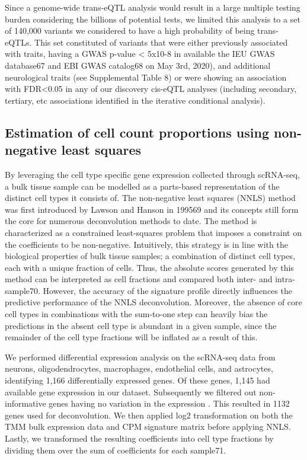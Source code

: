 Since a genome-wide trans-eQTL analysis would result in a large multiple testing burden considering the billions of potential tests, we limited this analysis to a set of 140,000 variants we considered to have a high probability of being trans-eQTLs. This set constituted of variants that were either previously associated with traits, having a GWAS p-value < 5x10-8 in available the IEU GWAS database67 and EBI GWAS catalog68 on May 3rd, 2020), and additional neurological traits (see Supplemental Table 8) or were showing an association with FDR<0.05 in any of our discovery cis-eQTL analyses (including secondary, tertiary, etc associations identified in the iterative conditional analysis). 

\subsection{Estimation of cell count proportions using non-negative least squares}
By leveraging the cell type specific gene expression collected through scRNA-seq, a bulk tissue sample can be modelled as a parts-based representation of the distinct cell types it consists of. The non-negative least squares (NNLS) method was first introduced by Lawson and Hanson in 199569 and its concepts still form the core for numerous deconvolution methods to date. The method is characterized as a constrained least-squares problem that imposes a constraint on the coefficients to be non-negative. Intuitively, this strategy is in line with the biological properties of bulk tissue samples; a combination of distinct cell types, each with a unique fraction of cells. Thus, the absolute scores generated by this method can be interpreted as cell fractions and compared both inter- and intra-sample70. However, the accuracy of the signature profile directly influences the predictive performance of the NNLS deconvolution. Moreover, the absence of core cell types in combinations with the sum-to-one step can heavily bias the predictions in the absent cell type is abundant in a given sample, since the remainder of the cell type fractions will be inflated as a result of this. 

We performed differential expression analysis on the scRNA-seq data from neurons, oligodendrocytes, macrophages, endothelial cells, and astrocytes, identifying 1,166 differentially expressed genes. Of these genes, 1,145 had available gene expression in our dataset. Subsequently we filtered out non-informative genes having no variation in the expression . This resulted in 1132 genes used for deconvolution. We then applied log2 transformation on both the TMM bulk expression data and CPM signature matrix before applying NNLS. Lastly, we transformed the resulting coefficients into cell type fractions by dividing them over the sum of coefficients for each sample71. 


